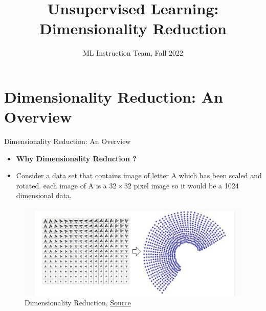 \documentclass[compress,oilve]{beamer}
\title{Unsupervised Learning: Dimensionality Reduction}
\author{ML Instruction Team, Fall 2022}
\institute[]{CE Department \newline  Sharif University of Technology \newline \newline}
\date[\today]{}
\newcommand{\tc}[2]{
 \textcolor{#1}{\textbf{#2}}
}
\begin{document}
	
	\fontsize{9}{9}
\begin{frame}
	\titlepage
\end{frame}

\section{Dimensionality Reduction: An Overview}

\begin{frame}{Dimensionality Reduction: An Overview}
\begin{itemize}
\item \tc{keywords}{Why Dimensionality Reduction ?}
	\medskip
\item Consider a data set that contains image of letter A which has been scaled and rotated. each image of A is a $ 32 \times 32 $ pixel image so it would be a 1024 dimensional data.

\end{itemize}
\begin{figure}
		\includegraphics[scale=0.5]{3}
		\caption{Dimensionality Reduction, \href{https://tinyurl.com/2q6ec2c6}{Source}}
	\end{figure}
		
		
\end{frame}
\end{document}
